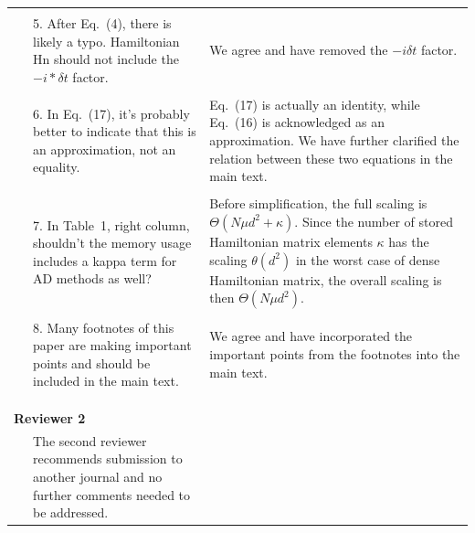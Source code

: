 \documentclass{article}
\begin{document}
\begin{center}
\begin{longtable}{cp{5.50cm}p{11.5cm}}
\\
\multicolumn{3}{l}{}  \\
~ & {\color{grey}
5. After Eq.\ (4), there is likely a typo. Hamiltonian Hn should not include the $-i*\delta t$ factor.}  
&

We agree and have removed the $-i\delta t $ factor.

\\
\multicolumn{3}{l}{}  \\
~ & {\color{grey}
6. In Eq.\ (17), it’s probably better to indicate that this is an approximation, not an equality.}
&
Eq.\ (17) is actually an identity, while Eq.\ (16) is acknowledged as an approximation. We have further clarified the relation between these two equations in the main text.  


\\
\multicolumn{3}{l}{}  \\
~ & {\color{grey}
7. In Table\ 1, right column, shouldn’t the memory usage includes a kappa term for AD methods as well?}

&
 Before simplification, the full scaling is $\Theta(N\mu d^2 +\kappa)$. Since the number of stored Hamiltonian matrix elements $\kappa$ has the scaling $\theta(d^2)$ in the worst case of dense Hamiltonian matrix, the overall scaling is then $\Theta(N\mu d^2)$.
\\
\multicolumn{3}{l}{}  \\
~ & {\color{grey}
8. Many footnotes of this paper are making important points and should be included in the main text.}
&

We agree and have incorporated the important points from the footnotes into the main text.


\\
\\
\\
\\
\multicolumn{3}{l}{\textbf{Reviewer 2}}  \\
\hline
~ & {\color{grey}
The second reviewer recommends submission to another journal and no further comments needed to be addressed.}
& 





\end{longtable}
\end{center}
\end{document}
